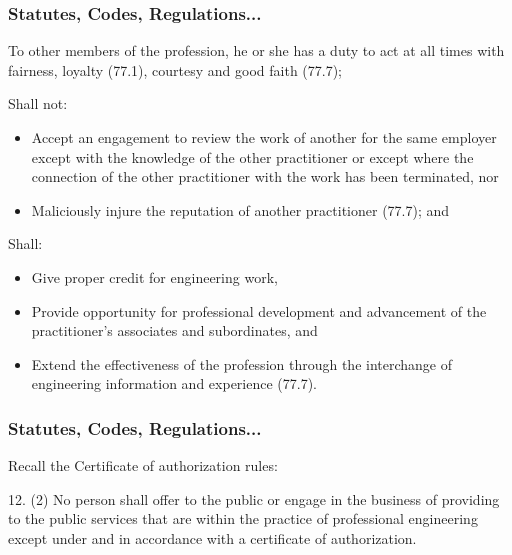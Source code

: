 \begin{frame}
\frametitle{Statutes, Codes, Regulations...}

To other members of the profession, he or she has a duty to act at all times with fairness, loyalty (77.1), courtesy and good faith (77.7);


Shall not:
\begin{itemize}
\item Accept an engagement to review the work of another for the same employer except with the knowledge of the other practitioner or except where the connection of the other practitioner with the work has been terminated, nor
\item Maliciously injure the reputation of another practitioner (77.7); and
\end{itemize}
Shall:
\begin{itemize}
\item Give proper credit for engineering work,
\item Provide opportunity for professional development and advancement of the practitioner's associates and subordinates, and
\item Extend the effectiveness of the profession through the interchange of engineering information and experience (77.7). 
\end{itemize}


\end{frame}



\begin{frame}
\frametitle{Statutes, Codes, Regulations...}

Recall the Certificate of authorization rules:

12. (2) No person shall offer to the public or engage in the business
of providing to the public services that are within the practice of
professional engineering except under and in accordance with a certificate of authorization. 

\end{frame}



